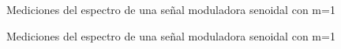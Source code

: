 \documentclass[../../labo_tp5_main.tex]{subfiles}
\begin{document}
\begin{figure}[H]	
	\centering
	\caption{Mediciones del espectro de una señal moduladora senoidal con m=1}
	\label{fig:ej1_labo_tp5_ej3_c_2}
\end{figure}
\begin{figure}[H]	
	\centering
	\caption{Mediciones del espectro de una señal moduladora senoidal con m=1}
	\label{fig:ej1_labo_tp5_ej3_d}
\end{figure}
\end{document}
